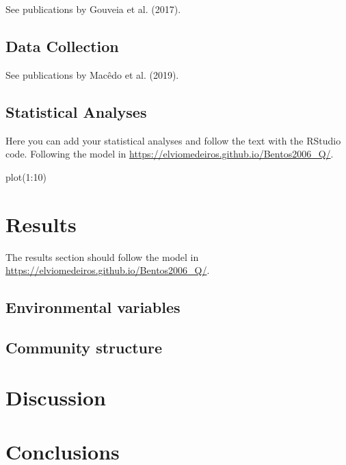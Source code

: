 \documentclass[
  american,
  letterpaper,
  DIV=11,
  numbers=noendperiod]{scrartcl}
\newenvironment{Shaded}{}{}
\newcommand{\DecValTok}[1]{\textcolor[rgb]{0.25,0.63,0.44}{#1}}
\newcommand{\FunctionTok}[1]{\textcolor[rgb]{0.02,0.16,0.49}{#1}}
\newcommand{\NormalTok}[1]{#1}
\newcommand{\SpecialCharTok}[1]{\textcolor[rgb]{0.25,0.44,0.63}{#1}}
\begin{document}
See publications by Gouveia et al. (2017).

\subsection{Data Collection}\label{sec-data-col}

See publications by Macêdo et al. (2019).

\subsection{Statistical Analyses}\label{statistical-analyses}

Here you can add your statistical analyses and follow the text with the
RStudio code. Following the model in
\url{https://elviomedeiros.github.io/Bentos2006_Q/}.

\begin{Shaded}
\begin{Highlighting}[numbers=left,,]
\FunctionTok{plot}\NormalTok{(}\DecValTok{1}\SpecialCharTok{:}\DecValTok{10}\NormalTok{)}
\end{Highlighting}
\end{Shaded}

\section{Results}\label{results}

The results section should follow the model in
\url{https://elviomedeiros.github.io/Bentos2006_Q/}.

\subsection{Environmental variables}\label{environmental-variables}

\subsection{Community structure}\label{community-structure}

\section{Discussion}\label{discussion}

\section*{Conclusions}\label{conclusions}
\end{document}
